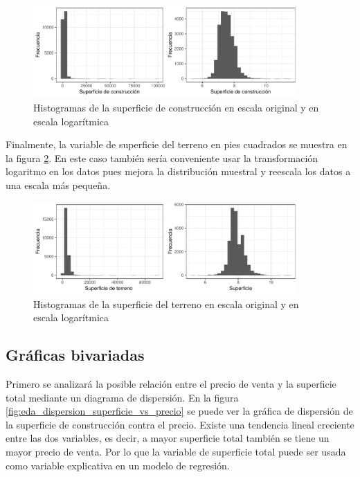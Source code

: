 \begin{figure}[H]
    \centering
    \includegraphics[width=0.9\textwidth]{images/eda_histograma_superficie.pdf}
    \caption{Histogramas de la superficie de construcción en escala original y en escala logarítmica}
    \label{fig:eda_histograma_superficie}
\end{figure}


Finalmente, la variable de superficie del terreno en pies cuadrados se muestra en la figura \ref{fig:eda_histograma_superficie_total_land}. En este caso también sería conveniente usar la transformación logaritmo en los datos pues mejora la distribución muestral y reescala los datos a una escala más pequeña.

\begin{figure}[H]
    \centering
    \includegraphics[width=0.9\textwidth]{images/eda_histograma_superficie_total_land.pdf}
    \caption{Histogramas de la superficie del terreno en escala original y en escala logarítmica}
    \label{fig:eda_histograma_superficie_total_land}
\end{figure}






\subsection{Gráficas bivariadas}

Primero se analizará la posible relación entre el precio de venta y la superficie total mediante un diagrama de dispersión. En la figura \ref{fig:eda_dispersion_superficie_vs_precio} se puede ver la gráfica de dispersión de la superficie de construcción contra el precio. Existe una tendencia lineal creciente entre las dos variables, es decir, a mayor superficie total también se tiene un mayor precio de venta. Por lo que la variable de superficie total puede ser usada como variable explicativa en un modelo de regresión.

